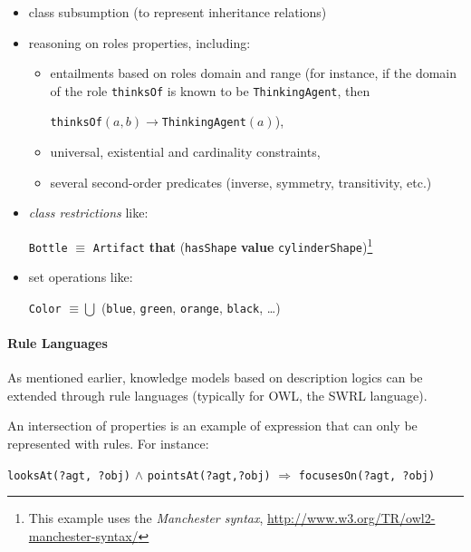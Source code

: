 \documentclass[a4paper, twocolumn]{article}
\newcommand{\concept}[1]{{\footnotesize \texttt{#1}}}
\begin{document}
\begin{itemize}
    \item class subsumption (to represent inheritance relations)

    \item reasoning on roles properties, including:
        \begin{itemize}
        \item entailments based on roles domain and range (for instance, if the
        domain of the role \concept{thinksOf} is known to be
        \concept{ThinkingAgent}, then \par \concept{thinksOf}$(a, b) \to
        $\concept{ThinkingAgent}$(a)$),

        \item universal, existential and cardinality constraints,

        \item several second-order predicates (inverse, symmetry, transitivity, etc.)

        \end{itemize}

    \item \emph{class restrictions} like: \par 
	\footnotesize 
	\concept{Bottle} $\equiv$ \concept{Artifact} {\bf that} (\concept{hasShape}
	{\bf value} \concept{cylinderShape})\footnote{This example uses the \emph{Manchester
    syntax}, \url{http://www.w3.org/TR/owl2-manchester-syntax/}}
	\normalsize

    \item set operations like: \par 
    \footnotesize 
    \concept{Color} $\equiv \bigcup$ (\concept{blue}, \concept{green},
    \concept{orange}, \concept{black}, \ldots) 
    \normalsize

\end{itemize}

\paragraph{Rule Languages} As mentioned earlier, knowledge models based on
description logics can be extended through rule languages (typically for OWL,
the SWRL language).

An intersection of properties is an example of expression that can only be
represented with rules. For instance:

\footnotesize
\concept{looksAt(?agt, ?obj)} $\land$ \concept{pointsAt(?agt,?obj)}
$\Rightarrow$ \concept{focusesOn(?agt, ?obj)}
\normalsize
\end{document}
